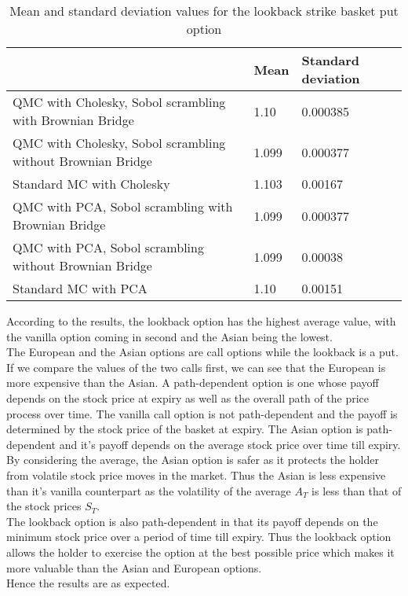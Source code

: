 \documentclass{article}
\begin{document}
\begin{table} [h!]
\centering
\begin{tabular}{| l | l | l |}
\hline
 & Mean & Standard deviation \\ \hline
QMC with Cholesky, Sobol scrambling with Brownian Bridge & 1.10 & 0.000385 \\ \hline
QMC with Cholesky, Sobol scrambling without Brownian Bridge & 1.099 & 0.000377 \\ \hline
Standard MC with Cholesky & 1.103 & 0.00167 \\ \hline
QMC with PCA, Sobol scrambling with Brownian Bridge & 1.099 & 0.000377 \\ \hline
QMC with PCA, Sobol scrambling without Brownian Bridge & 1.099 & 0.00038 \\ \hline
Standard MC with PCA & 1.10 & 0.00151 \\
\hline
\end{tabular}
\caption{Mean and standard deviation values for the lookback strike basket put option}
\end{table}

According to the results, the lookback option has the highest average value, with the vanilla option coming in second and the Asian being the lowest. \\
The European and the Asian options are call options while the lookback is a put. If we compare the values of the two calls first, we can see that the European is more expensive than the Asian. A path-dependent option is one whose payoff depends on the stock price at expiry as well as the overall path of the price process over time.
The vanilla call option is not path-dependent and the payoff is determined by the stock price of the basket at expiry. The Asian option is path-dependent and it's payoff depends on the average stock price over time till expiry. By considering the average, the Asian option is safer as it protects the holder from volatile stock price moves in the market. Thus the Asian is less expensive than it's vanilla counterpart as the volatility of the average $A_T$ is less than that of the stock prices $S_T$. \\
The lookback option is also path-dependent in that its payoff depends on the minimum stock price over a period of time till expiry. Thus the lookback option allows the holder to exercise the option at the best possible price which makes it more valuable than the Asian and European options. \\
Hence the results are as expected. 
\end{document}
